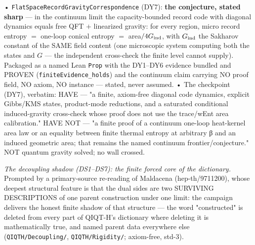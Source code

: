 \documentclass[11pt,a4paper]{article}
\begin{document}
  • \texttt{FlatSpaceRecordGravityCorrespondence} (DY7): \textbf{the conjecture, stated sharp} — in the continuum limit the capacity-bounded record code with diagonal dynamics equals free QFT $+$ linearized gravity: for every region, micro record entropy $=$ one-loop conical entropy $=$ area$/4G_{\rm ind}$, with $G_{\rm ind}$ the Sakharov constant of the SAME field content (one microscopic system computing both the states and $G$ — the independent cross-check the finite level cannot supply). Packaged as a named Lean \texttt{Prop} with the DY1--DY6 evidence bundled and PROVEN (\texttt{finiteEvidence\_holds}) and the continuum claim carrying NO proof field, NO axiom, NO instance — stated, never assumed.
  • The checkpoint (DY7), verbatim: HAVE — "a finite, axiom-free diagonal code dynamics, explicit Gibbs/KMS states, product-mode reductions, and a saturated conditional induced-gravity cross-check whose proof does not use the trace/wEnt area calibration." HAVE NOT — "a finite proof of a continuum one-loop heat-kernel area law or an equality between finite thermal entropy at arbitrary β and an induced geometric area; that remains the named continuum frontier/conjecture." NOT quantum gravity solved; no wall crossed.

\emph{The decoupling shadow (DS1--DS7): the finite forced core of the dictionary.} Prompted by a primary-source re-reading of Maldacena (hep-th/9711200), whose deepest structural feature is that the dual sides are two SURVIVING DESCRIPTIONS of one parent construction under one limit: the campaign delivers the honest finite shadow of that structure — the word "constructed" is deleted from every part of QIQT-H's dictionary where deleting it is mathematically true, and named parent data everywhere else (\texttt{QIQTH/Decoupling/}, \texttt{QIQTH/Rigidity/}; axiom-free, std-3).
\end{document}
